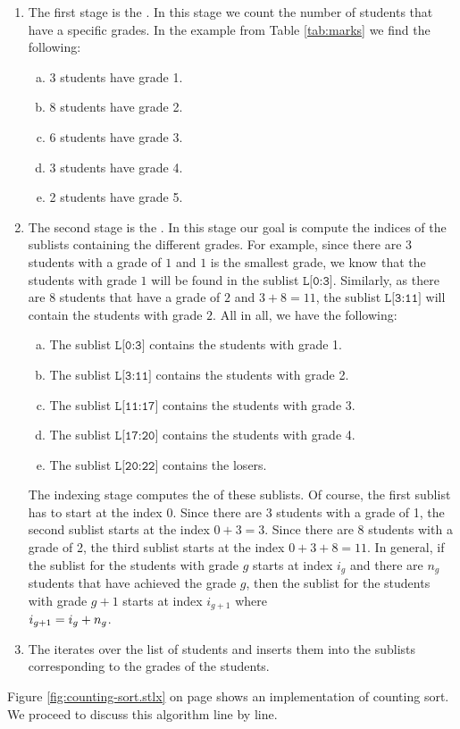 \begin{enumerate}
\item The first stage is the .  In this stage we count the number of students
      that have a specific grades.  In the example from Table \ref{tab:marks} we find the following:
      \begin{enumerate}[(a)]
      \item 3 students have grade 1.
      \item 8 students have grade 2.
      \item 6 students have grade 3.
      \item 3 students have grade 4.
      \item 2 students have grade 5.
      \end{enumerate}
\item The second stage is the .  In this stage our goal is compute the indices of the
      sublists containing the different grades.  For example, since there are 3 students with a grade of $1$
      and $1$ is the smallest grade, we know that the students with grade $1$ will be found in the sublist
      $\texttt{L[0:3]}$.  Similarly, as there are $8$ students that have a grade of $2$ and $3 + 8 = 11$,
      the sublist $\texttt{L[3:11]}$ will contain the students with grade $2$.
      All in all, we have the following:
      \begin{enumerate}[(a)]
      \item The sublist $\texttt{L[0:3]}$ contains the students with grade 1.
      \item The sublist $\texttt{L[3:11]}$ contains the students with grade 2.
      \item The sublist $\texttt{L[11:17]}$ contains the students with grade 3.
      \item The sublist $\texttt{L[17:20]}$ contains the students with grade 4.
      \item The sublist $\texttt{L[20:22]}$ contains the losers.
      \end{enumerate}
      The indexing stage computes the  of these sublists.
      Of course,  the first sublist has to start at the index $0$.  Since there are 3 students with a grade of 1,
      the second sublist starts at the index $0 + 3 = 3$.  Since there are 8 students with a grade of 2, the third
      sublist starts at the index $0 + 3 + 8 = 11$.  In general, if the sublist for the students with grade $g$
      starts at index $i_g$ and there are $n_g$ students that have achieved the grade $g$, then the sublist for the
      students with grade $g+1$ starts at index $i_{g+1}$ where
      \\[0.2cm]
      \hspace*{1.3cm}
      $\displaystyle i_{g+1} = i_g + n_g$.
\item The  iterates over the list of students and inserts them into the sublists
      corresponding to the grades of the students.
\end{enumerate}
Figure \ref{fig:counting-sort.stlx} on page \pageref{fig:counting-sort.stlx} shows an implementation of
counting sort.  We proceed to discuss this algorithm line by line.

